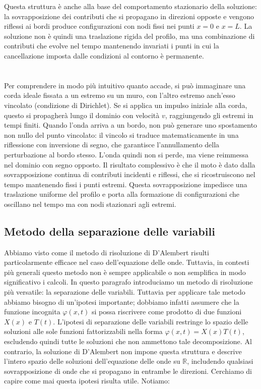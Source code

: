 \documentclass[a4paper,12pt]{report}
\begin{document}
Questa struttura è anche alla base del comportamento stazionario della soluzione: la sovrapposizione dei contributi che si propagano in direzioni opposte e vengono riflessi ai bordi produce configurazioni con nodi fissi nei punti $x=0$ e $x=L$. La soluzione non è quindi una traslazione rigida del profilo, ma una combinazione di contributi che evolve nel tempo mantenendo invariati i punti in cui la cancellazione imposta dalle condizioni al contorno è permanente.
\\
\\
\\Per comprendere in modo più intuitivo quanto accade, si può immaginare una corda ideale fissata a un estremo su un muro, con l’altro estremo anch’esso vincolato (condizione di Dirichlet). Se si applica un impulso iniziale alla corda, questo si propagherà lungo il dominio con velocità $v$, raggiungendo gli estremi in tempi finiti.
Quando l’onda arriva a un bordo, non può generare uno spostamento non nullo del punto vincolato: il vincolo si traduce matematicamente in una riflessione con inversione di segno, che garantisce l’annullamento della perturbazione al bordo stesso. L'onda quindi non si perde, ma viene reimmessa nel dominio con segno opposto.
Il risultato complessivo è che il moto è dato dalla sovrapposizione continua di contributi incidenti e riflessi, che si ricostruiscono nel tempo mantenendo fissi i punti estremi. Questa sovrapposizione impedisce una traslazione uniforme del profilo e porta alla formazione di configurazioni che oscillano nel tempo ma con nodi stazionari agli estremi.

\newpage

\subsection{Metodo della separazione delle variabili}\label{sec: 4.2.3}

Abbiamo visto come il metodo di risoluzione di D’Alembert risulti particolarmente efficace nel caso dell’equazione delle onde. Tuttavia, in contesti più generali questo metodo non è sempre applicabile o non semplifica in modo significativo i calcoli. In questo paragrafo introduciamo un metodo di risoluzione più versatile: la separazione delle variabili. Tuttavia per applicare tale metodo abbiamo bisogno di un'ipotesi importante; dobbiamo infatti assumere che la funzione incognita $\varphi(x,t)$ si possa riscrivere come prodotto di due funzioni $X(x)$ e $T(t)$.
L’ipotesi di separazione delle variabili restringe lo spazio delle soluzioni alle sole funzioni fattorizzabili nella forma $\varphi(x,t)=X(x)T(t)$, escludendo quindi tutte le soluzioni che non ammettono tale decomposizione. Al contrario, la soluzione di D’Alembert non impone questa struttura e descrive l’intero spazio delle soluzioni dell’equazione delle onde su $\mathbb{R}$, includendo qualsiasi sovrapposizione di onde che si propagano in entrambe le direzioni. Cerchiamo di capire come mai questa ipotesi risulta utile. Notiamo:
\end{document}

